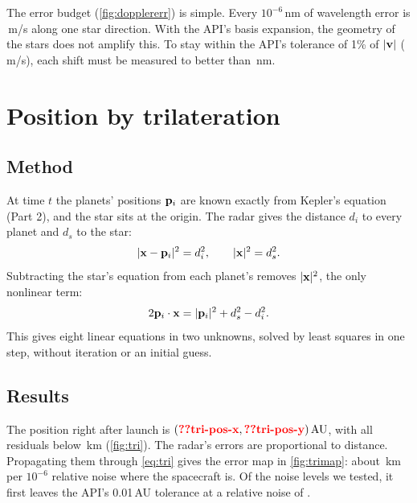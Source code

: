 \documentclass[aps,prd,twocolumn,nofootinbib,floatfix,superscriptaddress]{revtex4-2}
\begin{document}
The error budget (\cref{fig:dopplererr}) is simple.
Every $10^{-6}$\,nm of wavelength error is \,m/s along one star direction.
With the API's basis expansion, the geometry of the stars does not amplify this.
To stay within the API's tolerance of 1\% of $|\mathbf{v}|$ (\,m/s), each shift must be measured to better than \,nm.


\section{Position by trilateration}\label{sec:tri}
\subsection{Method}
At time $t$ the planets' positions $\mathbf{p}_i$ are known exactly from Kepler's equation (Part 2), and the star sits at the origin.
The radar gives the distance $d_i$ to every planet and $d_s$ to the star:
\begin{equation}
  |\mathbf{x}-\mathbf{p}_i|^2=d_i^2, \qquad |\mathbf{x}|^2=d_s^2.
\end{equation}
Subtracting the star's equation from each planet's removes $|\mathbf{x}|^2$, the only nonlinear term:
\begin{equation}
  2\mathbf{p}_i\cdot\mathbf{x} = |\mathbf{p}_i|^2+d_s^2-d_i^2. \label{eq:tri}
\end{equation}
This gives eight linear equations in two unknowns, solved by least squares in one step, without iteration or an initial guess.

\subsection{Results}
The position right after launch is $(\val{tri-pos-x},\val{tri-pos-y})\AU$, with all residuals below \,km (\cref{fig:tri}).
The radar's errors are proportional to distance.
Propagating them through \cref{eq:tri} gives the error map in \cref{fig:trimap}: about \,km per $10^{-6}$ relative noise where the spacecraft is.
Of the noise levels we tested, it first leaves the API's 0.01\,AU tolerance at a relative noise of .
\end{document}

